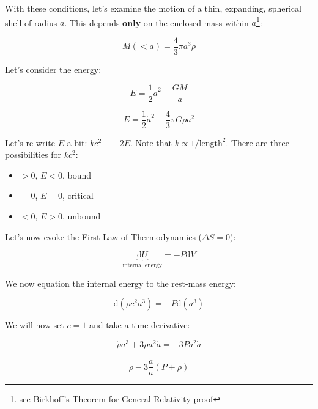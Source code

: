 \documentclass{article}
\begin{document}
With these conditions, let's examine the motion of a thin, expanding, spherical shell of radius $a$. This depends \textbf{only} on the enclosed mass within $a$\footnote{see Birkhoff's Theorem for General Relativity proof}:


\begin{equation}
    M(<a) = \frac{4}{3}\pi a^3 \rho
\end{equation}

Let's consider the energy:


\begin{equation}
    E = \frac12 \dot{a}^2 - \frac{GM}{a}
\end{equation}


\begin{equation}
E = \frac12 \dot{a}^2 - \frac43 \pi G \rho a^2
\end{equation}

Let's re-write $E$ a bit: $k c^2 \equiv -2E$. Note that $k \propto 1/\text{length}^2$. There are three possibilities for $kc^2$:

\begin{itemize}
    \item $>0$, $E<0$, bound
    \item $=0$, $E=0$, critical
    \item $<0$, $E>0$, unbound
\end{itemize}

Let's now evoke the First Law of Thermodynamics ($\Delta S = 0$):

\begin{equation}
   \underbrace{\mathrm{d}U}_\text{internal energy} = -P \mathrm{d}V 
\end{equation}

We now equation the internal energy to the rest-mass energy:

\begin{equation}
    \mathrm{d}\left(\rho c^2 a^3\right) = -P \mathrm{d}\left(a^3\right)
\end{equation}

We will now set $c = 1$ and take a time derivative:

\begin{equation}
    \dot{\rho} a^3 + 3 \rho a^2 \dot{a} = -3P a^2 \dot{a}
\end{equation}

\begin{equation}
    \dot{\rho} -3\frac{\dot{a}}{a}\left(P + \rho\right)
\end{equation}
\end{document}
